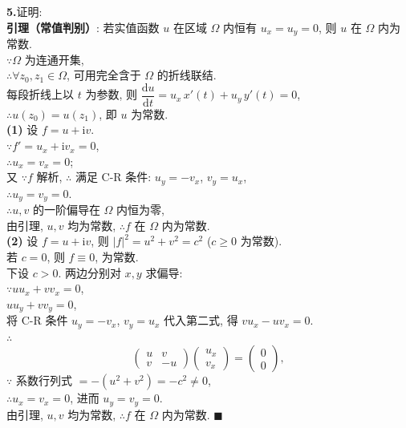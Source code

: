 \documentclass{article}
\begin{document}
\noindent
\begin{minipage}[t]{0.66\textwidth}
	
	\textbf{5.}\quad 证明:\\[4pt]
	\textbf{引理（常值判别）}: 若实值函数 $u$ 在区域 $\Omega$ 内恒有 $u_x=u_y=0$, 则 $u$ 在 $\Omega$ 内为常数.\\
	$\because\Omega$ 为连通开集,\\
	$\therefore\forall z_0,z_1\in\Omega$, 可用完全含于 $\Omega$ 的折线联结.\\
	每段折线上以 $t$ 为参数, 则 $\dfrac{\mathrm{d}u}{\mathrm{d}t}=u_x\,x'(t)+u_y\,y'(t)=0$,\\
	$\therefore u(z_0)=u(z_1)$, 即 $u$ 为常数.\\[4pt]
	
	\textbf{(1)} 设 $f=u+\mathrm{i}v$.\\
	$\because f'=u_x+\mathrm{i}v_x=0$,\\
	$\therefore u_x=v_x=0$;\\
	又 $\because f$ 解析, $\therefore$ 满足 C-R 条件: $u_y=-v_x$, $v_y=u_x$,\\
	$\therefore u_y=v_y=0$.\\
	$\therefore u,v$ 的一阶偏导在 $\Omega$ 内恒为零,\\
	由引理, $u,v$ 均为常数, $\therefore f$ 在 $\Omega$ 内为常数.\\[4pt]
	
	\textbf{(2)} 设 $f=u+\mathrm{i}v$, 则 $|f|^2=u^2+v^2=c^2$ ($c\geq0$ 为常数).\\
	若 $c=0$, 则 $f\equiv0$, 为常数.\\
	下设 $c>0$. 两边分别对 $x,y$ 求偏导:\\
	$\because uu_x+vv_x=0$,\\
	\quad $uu_y+vv_y=0$,\\
	将 C-R 条件 $u_y=-v_x$, $v_y=u_x$ 代入第二式, 得 $vu_x-uv_x=0$.\\
	$\therefore$
	\[
	\begin{pmatrix}u&v\\ v&-u\end{pmatrix}
	\begin{pmatrix}u_x\\ v_x\end{pmatrix}=
	\begin{pmatrix}0\\0\end{pmatrix},
	\]
	$\because$ 系数行列式 $=-(u^2+v^2)=-c^2\neq0$,\\
	$\therefore u_x=v_x=0$, 进而 $u_y=v_y=0$.\\
	由引理, $u,v$ 均为常数, $\therefore f$ 在 $\Omega$ 内为常数. $\blacksquare$
	
\end{minipage}
\end{document}

